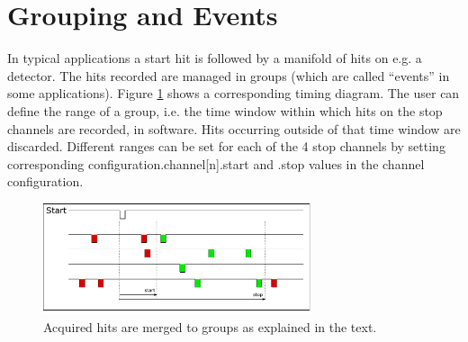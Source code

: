 \section{Grouping and Events}
\label{grouping}

In typical applications a start hit is followed by a manifold of hits on e.g. a detector. 
The hits recorded are managed in groups (which are called ``events'' in some applications). 
Figure \ref{fig:grouping} shows a corresponding timing diagram. The user can define the range of a group, i.e. the time window within which hits 
on the stop channels are recorded, in software. Hits occurring outside of that time window are discarded. 
 Different ranges can be set for each of the 4 stop channels by setting corresponding configuration.channel[n].start and .stop values in the channel configuration. 



%
\begin{figure}[ht]
    \begin{center}
        \includegraphics[width=0.7\textwidth]{figures/grouping.pdf}
        \caption{Acquired hits are merged to groups as explained in the text.\label{fig:grouping}}
    \end{center}
\end{figure}


%